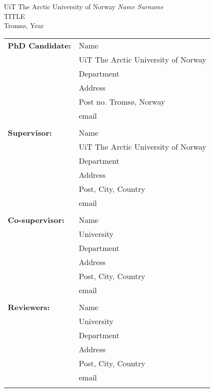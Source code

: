 \documentclass[12pt]{book}
\begin{document}


\newpage
\Large \center
UiT The Arctic University of Norway
\vfill
\textit{Name Surname}\\
\vspace{1cm}
\Huge\uppercase{Title}\\
\vspace{2cm}
\vfill
\normalsize Tromsø, Year
\thispagestyle{empty}

\newpage
\small
\begin{tabular}{@{}p{4cm}p{10cm}@{}} 
\textbf{PhD Candidate:} & Name \\
						& UiT The Arctic University of Norway \\
                        & Department \\
                        & Address \\
                        & Post no. Tromsø, Norway \\
                        & email\\ \\
                        
\textbf{Supervisor:} 	& Name\\
						& UiT The Arctic University of Norway \\
                        & Department \\
                        & Address \\
                        & Post, City, Country \\
                        & email\\ \\
                        
\textbf{Co-supervisor:} & Name \\
                  		& University \\
                  		& Department \\
                  		& Address\\
						& Post, City, Country \\
						& email\\ \\
						
\textbf{Reviewers:}     & Name \\
                  		& University \\
                  		& Department \\
                  		& Address\\
						& Post, City, Country \\
						& email\\ \\
						

\end{tabular}
\end{document}
